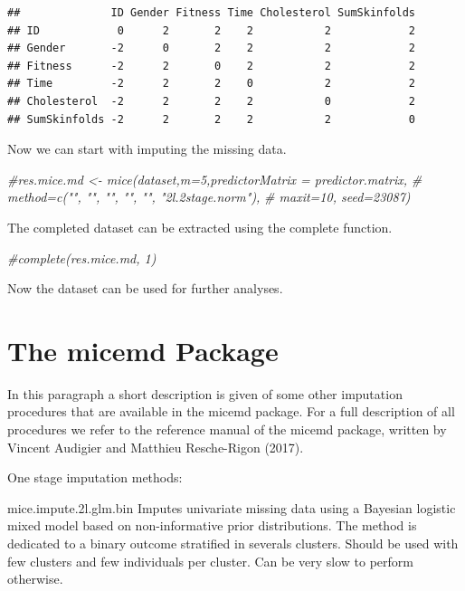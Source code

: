 \documentclass[]{book}
\newenvironment{Shaded}{\begin{snugshade}}{\end{snugshade}}
\newcommand{\CommentTok}[1]{\textcolor[rgb]{0.56,0.35,0.01}{\textit{#1}}}
\begin{document}
\begin{verbatim}
##              ID Gender Fitness Time Cholesterol SumSkinfolds
## ID            0      2       2    2           2            2
## Gender       -2      0       2    2           2            2
## Fitness      -2      2       0    2           2            2
## Time         -2      2       2    0           2            2
## Cholesterol  -2      2       2    2           0            2
## SumSkinfolds -2      2       2    2           2            0
\end{verbatim}

Now we can start with imputing the missing data.

\begin{Shaded}
\begin{Highlighting}[]
\CommentTok{#res.mice.md <- mice(dataset,m=5,predictorMatrix = predictor.matrix,}
\CommentTok{#                     method=c("", "",  "", "", "", "2l.2stage.norm"), }
\CommentTok{#                     maxit=10, seed=23087)}
\end{Highlighting}
\end{Shaded}

The completed dataset can be extracted using the complete function.

\begin{Shaded}
\begin{Highlighting}[]
\CommentTok{#complete(res.mice.md, 1)}
\end{Highlighting}
\end{Shaded}

Now the dataset can be used for further analyses.

\section{The micemd Package}\label{the-micemd-package}

In this paragraph a short description is given of some other imputation
procedures that are available in the micemd package. For a full
description of all procedures we refer to the reference manual of the
micemd package, written by Vincent Audigier and Matthieu Resche-Rigon
(2017).

One stage imputation methods:

mice.impute.2l.glm.bin Imputes univariate missing data using a Bayesian
logistic mixed model based on non-informative prior distributions. The
method is dedicated to a binary outcome stratified in severals clusters.
Should be used with few clusters and few individuals per cluster. Can be
very slow to perform otherwise.
\end{document}
